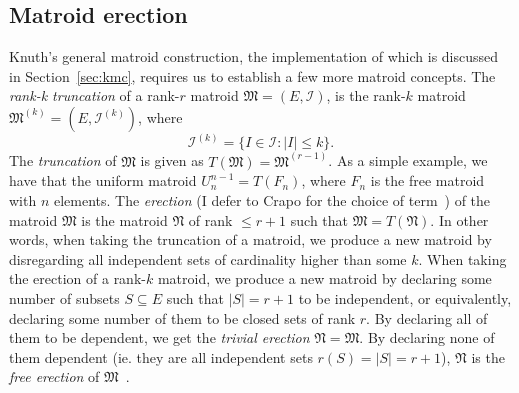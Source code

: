 \subsection{Matroid erection}
Knuth's general matroid construction, the implementation of which is discussed in Section~\ref{sec:kmc}, requires us to establish a few more matroid concepts. The \textit{rank-k truncation} of a rank-$r$ matroid $\mathfrak{M} = (E, \mathcal{I})$, is the rank-$k$ matroid $\mathfrak{M}^{(k)} = (E, \mathcal{I}^{(k)})$, where
$$\mathcal{I}^{(k)} = \{ I \in \mathcal{I} : |I| \leq k \}.$$
The \textit{truncation} of $\mathfrak{M}$ is given as $T(\mathfrak{M}) = \mathfrak{M}^{(r-1)}$. As a simple example, we have that the uniform matroid $U_n^{n-1} = T(F_n)$, where $F_n$ is the free matroid with $n$ elements. The \textit{erection} (I defer to Crapo for the choice of term~\cite{Crapo1970}) of the matroid $\mathfrak{M}$ is the matroid $\mathfrak{N}$ of rank $\leq r+1$ such that $\mathfrak{M} = T(\mathfrak{N})$. In other words, when taking the truncation of a matroid, we produce a new matroid by disregarding all independent sets of cardinality higher than some $k$. When taking the erection of a rank-$k$ matroid, we produce a new matroid by declaring some number of subsets $S \subseteq E$ such that $|S|=r+1$ to be independent, or equivalently, declaring some number of them to be closed sets of rank $r$. By declaring all of them to be dependent, we get the \textit{trivial erection} $\mathfrak{N} = \mathfrak{M}$. By declaring none of them dependent (ie. they are all independent sets $r(S) = |S| = r+1$), $\mathfrak{N}$ is the \textit{free erection} of $\mathfrak{M}$~\cite{greene-1991}.

